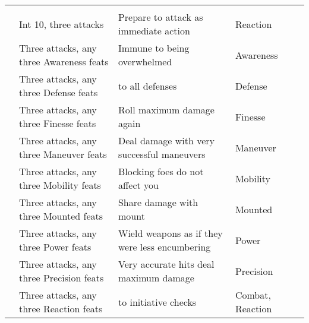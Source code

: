 {\begin{longtabu}{>{\lcol}p{10em} >{\lcol}p{15em} >{\lcol}X >{\lcol}p{6em} >{\lcol}p{3em}}
        \midrule
         &  &  &  &  \\
         & Int 10, three attacks & Prepare to attack as immediate action & Reaction &  \\
         & Three attacks, any three Awareness feats & Immune to being overwhelmed & Awareness &  \\
         & Three attacks, any three Defense feats &  to all defenses & Defense &  \\
         & Three attacks, any three Finesse feats & Roll maximum damage again & Finesse &  \\
         & Three attacks, any three Maneuver feats & Deal damage with very successful maneuvers & Maneuver &  \\
         & Three attacks, any three Mobility feats & Blocking foes do not affect you & Mobility&  \\
         & Three attacks, any three Mounted feats & Share damage with mount & Mounted&  \\
         & Three attacks, any three Power feats & Wield weapons as if they were less encumbering & Power&  \\
         & Three attacks, any three Precision feats & Very accurate hits deal maximum damage & Precision &  \\
         & Three attacks, any three Reaction feats &  to initiative checks & Combat, Reaction &  \\


\end{longtabu}}
